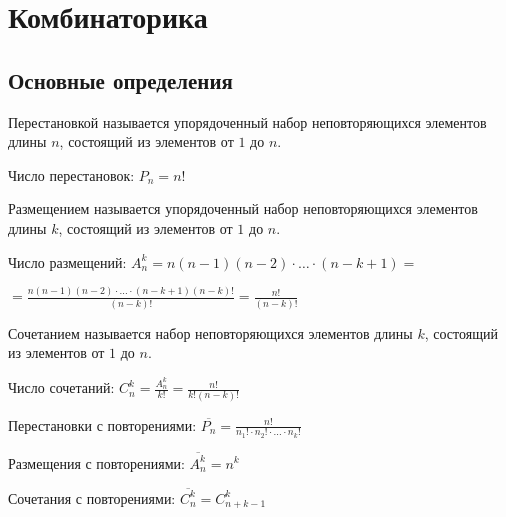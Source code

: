 


\chapter{Комбинаторика}


\section{Основные определения}

\begin{definition}
    Перестановкой называется упорядоченный набор неповторяющихся элементов длины $n$, состоящий из элементов от $1$ до $n$.

    Число перестановок: $P_n = n!$
\end{definition}

\begin{definition}
    Размещением называется упорядоченный набор неповторяющихся элементов длины $k$, состоящий из элементов от $1$ до $n$.

    Число размещений: $A_n^k = n(n - 1)(n - 2) \cdot \ldots \cdot (n - k + 1) = $
    
    $= \frac{n(n - 1)(n - 2) \cdot \ldots \cdot (n - k + 1)(n - k)!}{(n - k)!}= \frac{n!}{(n-k)!}$
\end{definition}


\begin{definition}
    Сочетанием называется набор неповторяющихся элементов длины $k$, состоящий из элементов от $1$ до $n$.

    Число сочетаний: $C_n^k = \frac{A_{n}^{k}}{k!}=\frac{n!}{k!(n-k)!}$
\end{definition}


\begin{definition}
    Перестановки с повторениями: $\overline{P_n} = \frac{n!}{n_1! \cdot n_2! \cdot \ldots \cdot n_k!}$
\end{definition}

\begin{definition}
    Размещения с повторениями: $\overline{A_n^k} = n^k$
\end{definition}

\begin{definition}
    Сочетания с повторениями: $\overline{C_n^k} = C_{n + k - 1}^k$
\end{definition}

